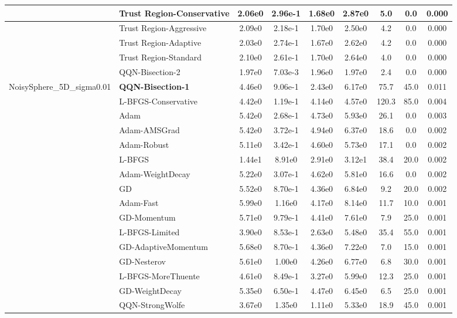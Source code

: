 \documentclass[10pt]{article}
\begin{document}
\begin{longtable}{|l|l|c|c|c|c|c|c|c|}
\hline
 & Trust Region-Conservative & 2.06e0 & 2.96e-1 & 1.68e0 & 2.87e0 & 5.0 & 0.0 & 0.000 \\
\hline
 & Trust Region-Aggressive & 2.09e0 & 2.18e-1 & 1.70e0 & 2.50e0 & 4.2 & 0.0 & 0.000 \\
\hline
 & Trust Region-Adaptive & 2.03e0 & 2.74e-1 & 1.67e0 & 2.62e0 & 4.2 & 0.0 & 0.000 \\
\hline
 & Trust Region-Standard & 2.10e0 & 2.61e-1 & 1.70e0 & 2.64e0 & 4.0 & 0.0 & 0.000 \\
\hline
 & QQN-Bisection-2 & 1.97e0 & 7.03e-3 & 1.96e0 & 1.97e0 & 2.4 & 0.0 & 0.000 \\
NoisySphere\_5D\_sigma0.01 & \textbf{QQN-Bisection-1} & 4.46e0 & 9.06e-1 & 2.43e0 & 6.17e0 & 75.7 & 45.0 & 0.011 \\
\hline
 & L-BFGS-Conservative & 4.42e0 & 1.19e-1 & 4.14e0 & 4.57e0 & 120.3 & 85.0 & 0.004 \\
\hline
 & Adam & 5.42e0 & 2.68e-1 & 4.73e0 & 5.93e0 & 26.1 & 0.0 & 0.003 \\
\hline
 & Adam-AMSGrad & 5.42e0 & 3.72e-1 & 4.94e0 & 6.37e0 & 18.6 & 0.0 & 0.002 \\
\hline
 & Adam-Robust & 5.11e0 & 3.42e-1 & 4.60e0 & 5.73e0 & 17.1 & 0.0 & 0.002 \\
\hline
 & L-BFGS & 1.44e1 & 8.91e0 & 2.91e0 & 3.12e1 & 38.4 & 20.0 & 0.002 \\
\hline
 & Adam-WeightDecay & 5.22e0 & 3.07e-1 & 4.62e0 & 5.81e0 & 16.6 & 0.0 & 0.002 \\
\hline
 & GD & 5.52e0 & 8.70e-1 & 4.36e0 & 6.84e0 & 9.2 & 20.0 & 0.002 \\
\hline
 & Adam-Fast & 5.99e0 & 1.16e0 & 4.17e0 & 8.14e0 & 11.7 & 10.0 & 0.001 \\
\hline
 & GD-Momentum & 5.71e0 & 9.79e-1 & 4.41e0 & 7.61e0 & 7.9 & 25.0 & 0.001 \\
\hline
 & L-BFGS-Limited & 3.90e0 & 8.53e-1 & 2.63e0 & 5.48e0 & 35.4 & 55.0 & 0.001 \\
\hline
 & GD-AdaptiveMomentum & 5.68e0 & 8.70e-1 & 4.36e0 & 7.22e0 & 7.0 & 15.0 & 0.001 \\
\hline
 & GD-Nesterov & 5.61e0 & 1.00e0 & 4.26e0 & 6.77e0 & 6.8 & 30.0 & 0.001 \\
\hline
 & L-BFGS-MoreThuente & 4.61e0 & 8.49e-1 & 3.27e0 & 5.99e0 & 12.3 & 25.0 & 0.001 \\
\hline
 & GD-WeightDecay & 5.35e0 & 6.50e-1 & 4.47e0 & 6.45e0 & 6.5 & 25.0 & 0.001 \\
\hline
 & QQN-StrongWolfe & 3.67e0 & 1.35e0 & 1.11e0 & 5.33e0 & 18.9 & 45.0 & 0.001 \\

\end{longtable}
\end{document}
